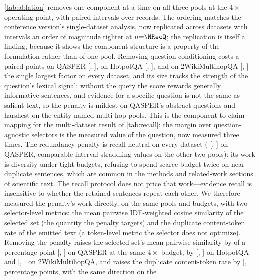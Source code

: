\documentclass[pdflatex,sn-basic]{sn-jnl}
\theoremstyle{remark}
\begin{document}
\autoref{tab:ablation} removes one component at a time on all three
pools at the $4\times$ operating point, with paired intervals over
records. The ordering matches the conference version's single-dataset
analysis, now replicated across datasets with intervals an order of
magnitude tighter at $n{=}\NRecQ$; the replication is itself a
finding, because it shows the component structure is a property of
the formulation rather than of one pool. Removing question
conditioning costs a paired \AblPairQNoQ{} points on QASPER
[\AblPairQNoQLo, \AblPairQNoQHi], \AblPairHNoQ{} on HotpotQA
[\AblPairHNoQLo, \AblPairHNoQHi], and \AblPairWNoQ{} on
2WikiMultihopQA [\AblPairWNoQLo, \AblPairWNoQHi]---the single
largest factor on every dataset, and its size tracks the strength of
the question's lexical signal: without the query the score rewards
generally informative sentences, and evidence for a specific question
is not the same as salient text, so the penalty is mildest on QASPER's
abstract questions and harshest on the entity-named multi-hop pools.
This is the component-to-claim mapping for the multi-dataset result of
\autoref{tab:recall}: the margin over question-agnostic selectors is
the measured value of the question, now measured three times. The
redundancy penalty is recall-neutral on every dataset (\AblPairQNoRed{}
[\AblPairQNoRedLo, \AblPairQNoRedHi] on QASPER, comparable
interval-straddling values on the other two pools): its work is
diversity under tight budgets, refusing to spend scarce budget twice
on near-duplicate sentences, which are common in the methods and
related-work sections of scientific text. The recall protocol does
not price that work---evidence recall is insensitive to whether the
retained sentences repeat each other.
\ifdefined\RedPairQFourDr
We therefore measured the penalty's work directly, on the same pools
and budgets, with two selector-level metrics: the mean pairwise
IDF-weighted cosine similarity of the selected set (the quantity the
penalty targets) and the duplicate content-token rate of the emitted
text (a token-level metric the selector does not optimize). Removing
the penalty raises the selected set's mean pairwise similarity by
\RedPairQFourSim{} of a percentage point [\RedPairQFourSimLo,
\RedPairQFourSimHi] on QASPER at the same $4\times$ budget, by
\RedPairHFourSim{} [\RedPairHFourSimLo, \RedPairHFourSimHi] on
HotpotQA and \RedPairWFourSim{} [\RedPairWFourSimLo,
\RedPairWFourSimHi] on 2WikiMultihopQA, and raises the duplicate
content-token rate by \RedPairQFourDr{} [\RedPairQFourDrLo,
\RedPairQFourDrHi] percentage points, with the same direction on the
\end{document}

